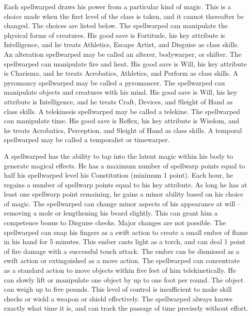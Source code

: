  Each spellwarped draws his power from a particular kind of magic. This is a choice made when the first level of the class is taken, and it cannot thereafter be changed. The choices are listed below.
 The spellwarped can manipulate the physical forms of creatures. His good save is Fortitude, his key attribute is Intelligence, and he treats Athletics, Escape Artist, and Disguise as class skills. An alteration spellwarped may be called an alterer, bodywarper, or shifter.
 The spellwarped can manipulate fire and heat. His good save is Will, his key attribute is Charisma, and he treats Acrobatics, Athletics, and Perform as class skills. A pyromancy spellwarped may be called a pyromancer.
 The spellwarped can manipulate objects and creatures with his mind. His good save is Will, his key attribute is Intelligence, and he treats Craft, Devices, and Sleight of Hand as class skills. A telekinesis spellwarped may be called a telekine.
 The spellwarped can manipulate time. His good save is Reflex, his key attribute is Wisdom, and he treats Acrobatics, Perception, and Sleight of Hand as class skills. A temporal spellwarped may be called a temporalist or timewarper.

 A spellwarped has the ability to tap into the latent magic within his body to generate magical effects. He has a maximum number of spellwarp points equal to half his spellwarped level \add his Constitution (minimum 1 point). Each hour, he regains a number of spellwarp points equal to his key attribute. As long he has at least one spellwarp point remaining, he gains a minor ability based on his choice of magic.
 The spellwarped can change minor aspects of his appearance at will -- removing a mole or lengthening his beard slightly. This can grant him a  competence bonus to Disguise checks. Major changes are not possible.
 The spellwarped can snap his fingers as a swift action to create a small ember of flame in his hand for 5 minutes. This ember casts light as a torch, and can deal 1 point of fire damage with a successful touch attack. The ember can be dismissed as a swift action or extinguished as a move action.
 The spellwarped can concentrate as a standard action to move objects within five feet of him telekinetically. He can slowly lift or manipulate one object by up to one foot per round. The object can weigh up to five pounds. This level of control is insufficient to make skill checks or wield a weapon or shield effectively.
 The spellwarped always knows exactly what time it is, and can track the passage of time precisely without effort.

